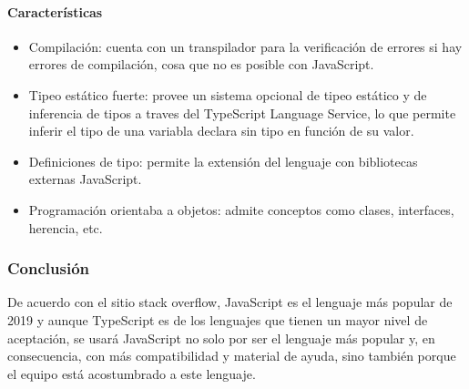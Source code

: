 \paragraph*{Características}
\begin{itemize}
    \item Compilación: cuenta con un transpilador para la verificación de errores si hay errores de compilación, cosa que no es posible con JavaScript.
    \item Tipeo estático fuerte: provee un sistema opcional de tipeo estático y de inferencia de tipos a traves del TypeScript Language Service, lo que permite inferir el tipo de una variabla declara sin tipo en función de su valor.
    \item Definiciones de tipo: permite la extensión del lenguaje con bibliotecas externas JavaScript.
    \item Programación orientaba a objetos: admite conceptos como clases, interfaces, herencia, etc.
\end{itemize}



\subsubsection*{Conclusión}

De acuerdo con el sitio stack overflow\cite{noauthor_stack_nodate}, JavaScript es el lenguaje más popular de 2019 y aunque TypeScript es de los lenguajes que tienen un mayor nivel de aceptación, se usará JavaScript no solo por ser el lenguaje más popular y, en consecuencia, con más compatibilidad y material de ayuda, sino también porque el equipo está acostumbrado a este lenguaje.

